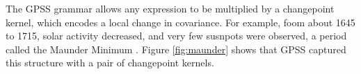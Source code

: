 \documentclass{article} %
\begin{document}


The GPSS grammar allows any expression to be multiplied by a changepoint kernel, which encodes a local change in covariance. For example, foom about 1645 to 1715, solar activity decreased, and very few susnpots were observed, a period called the Maunder Minimum \citep{lean1995reconstruction}. Figure \ref{fig:maunder} shows that GPSS captured this structure with a pair of changepoint kernels.%


\end{document}
